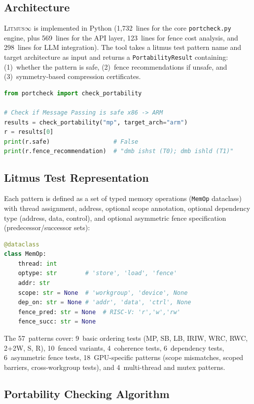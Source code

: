 \documentclass[10pt]{article}
\newcommand{\litmus}{\textsc{Litmus$\infty$}}
\begin{document}
\subsection{Architecture}

\litmus{} is implemented in Python (1,732~lines for the core
\texttt{portcheck.py} engine, plus 569~lines for the API layer,
123~lines for fence cost analysis, and 298~lines for LLM integration).
The tool takes a litmus test pattern name and target architecture as
input and returns a \texttt{PortabilityResult} containing: (1)~whether
the pattern is safe, (2)~fence recommendations if unsafe, and
(3)~symmetry-based compression certificates.

\begin{lstlisting}[language=Python, caption={Core API usage}]
from portcheck import check_portability

# Check if Message Passing is safe x86 -> ARM
results = check_portability("mp", target_arch="arm")
r = results[0]
print(r.safe)                  # False
print(r.fence_recommendation)  # "dmb ishst (T0); dmb ishld (T1)"
\end{lstlisting}

\subsection{Litmus Test Representation}

Each pattern is defined as a set of typed memory operations
(\texttt{MemOp} dataclass) with thread assignment, address, optional
scope annotation, optional dependency type (address, data, control),
and optional asymmetric fence specification (predecessor/successor sets):

\begin{lstlisting}[language=Python, caption={MemOp representation}]
@dataclass
class MemOp:
    thread: int
    optype: str        # 'store', 'load', 'fence'
    addr: str
    scope: str = None  # 'workgroup', 'device', None
    dep_on: str = None # 'addr', 'data', 'ctrl', None
    fence_pred: str = None  # RISC-V: 'r','w','rw'
    fence_succ: str = None
\end{lstlisting}

The 57~patterns cover: 9~basic ordering tests (MP, SB, LB, IRIW, WRC,
RWC, 2+2W, S, R), 10~fenced variants, 4~coherence tests, 6~dependency
tests, 6~asymmetric fence tests, 18~GPU-specific patterns (scope
mismatches, scoped barriers, cross-workgroup tests), and 4~multi-thread
and mutex patterns.

\subsection{Portability Checking Algorithm}
\end{document}
